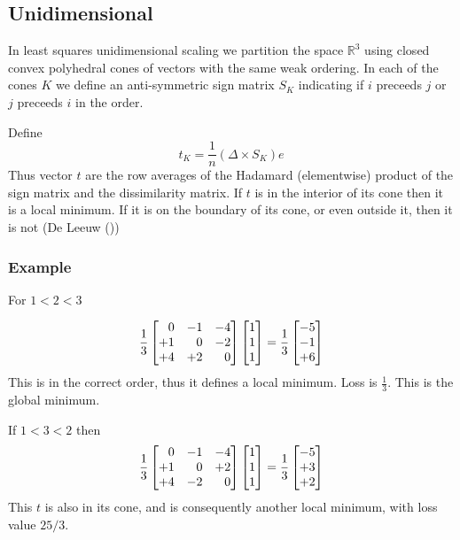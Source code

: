 \documentclass[
  12pt,
  letterpaper,
  DIV=11,
  numbers=noendperiod]{scrartcl}
\begin{document}
\subsection{Unidimensional}\label{unidimensional}

In least squares unidimensional scaling we partition the space
\(\mathbb{R}^3\) using closed convex polyhedral cones of vectors with
the same weak ordering. In each of the cones \(K\) we define an
anti-symmetric sign matrix \(S_K\) indicating if \(i\) preceeds \(j\) or
\(j\) preceeds \(i\) in the order.

Define \[
t_K=\frac{1}{n}(\Delta\times S_K)e
\] Thus vector \(t\) are the row averages of the Hadamard (elementwise)
product of the sign matrix and the dissimilarity matrix. If \(t\) is in
the interior of its cone then it is a local minimum. If it is on the
boundary of its cone, or even outside it, then it is not (De Leeuw
())

\subsubsection{Example}\label{example-1}

For \(1<2<3\)

\[
\frac13\begin{bmatrix}
\hfill 0&-1&-4\\
+1&\hfill 0&-2\\
+4&+2&\hfill 0
\end{bmatrix}
\begin{bmatrix}
1\\
1\\
1
\end{bmatrix}=
\frac13\begin{bmatrix}
-5\\
-1\\
+6
\end{bmatrix}
\] This is in the correct order, thus it defines a local minimum. Loss
is \(\frac13\). This is the global minimum.

If \(1<3<2\) then \[
\frac13\begin{bmatrix}
\hfill 0&-1&-4\\
+1&\hfill 0&+2\\
+4&-2&\hfill 0
\end{bmatrix}
\begin{bmatrix}
1\\
1\\
1
\end{bmatrix}=
\frac13\begin{bmatrix}
-5\\
+3\\
+2
\end{bmatrix}
\] This \(t\) is also in its cone, and is consequently another local
minimum, with loss value \(25/3\).
\end{document}
